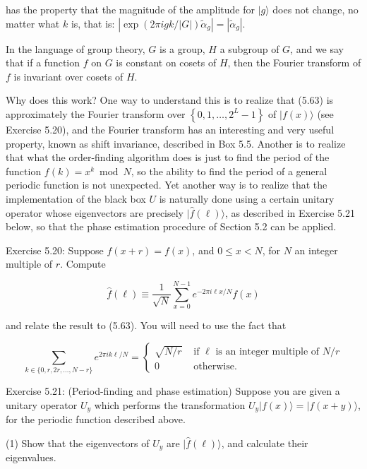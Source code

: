 has the property that the magnitude of the amplitude for $|g\rangle$ does not change, no matter what $k$ is, that is: $\left|\exp (2 \pi i g k /|G|) \tilde{\alpha}_{g}\right|=\left|\tilde{\alpha}_{g}\right|$.

In the language of group theory, $G$ is a group, $H$ a subgroup of $G$, and we say that if a function $f$ on $G$ is constant on cosets of $H$, then the Fourier transform of $f$ is invariant over cosets of $H$.

Why does this work? One way to understand this is to realize that (5.63) is approximately the Fourier transform over $\left\{0,1, \ldots, 2^{L}-1\right\}$ of $|f(x)\rangle$ (see Exercise 5.20), and the Fourier transform has an interesting and very useful property, known as shift invariance, described in Box 5.5. Another is to realize that what the order-finding algorithm does is just to find the period of the function $f(k)=x^{k} \bmod N$, so the ability to find the period of a general periodic function is not unexpected. Yet another way is to realize that the implementation of the black box $U$ is naturally done using a certain unitary operator whose eigenvectors are precisely $|\hat{f}(\ell)\rangle$, as described in Exercise 5.21 below, so that the phase estimation procedure of Section 5.2 can be applied.

Exercise 5.20: Suppose $f(x+r)=f(x)$, and $0 \leq x<N$, for $N$ an integer multiple of $r$. Compute

\begin{equation}
    \hat{f}(\ell) \equiv \frac{1}{\sqrt{N}} \sum_{x=0}^{N-1} e^{-2 \pi i \ell x / N} f(x) \tag{5.68}
\end{equation}

and relate the result to (5.63). You will need to use the fact that

\begin{equation}
    \sum_{k \in\{0, r, 2 r, \ldots, N-r\}} e^{2 \pi i k \ell / N}= \begin{cases}\sqrt{N / r} & \text { if } \ell \text { is an integer multiple of } N / r  \tag{5.69}\\ 0 & \text { otherwise. }\end{cases}
\end{equation}

Exercise 5.21: (Period-finding and phase estimation) Suppose you are given a unitary operator $U_{y}$ which performs the transformation $U_{y}|f(x)\rangle=|f(x+y)\rangle$, for the periodic function described above.

(1) Show that the eigenvectors of $U_{y}$ are $|\hat{f}(\ell)\rangle$, and calculate their eigenvalues.

